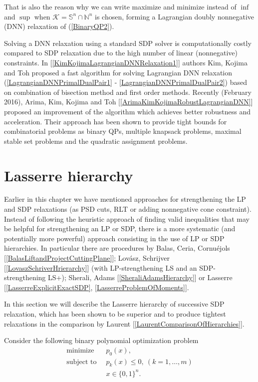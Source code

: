 \documentclass[12pt]{book}
\theoremstyle{definition}
\begin{document}
That is also the reason why we can write maximize and minimize instead of $\inf$ and $\sup$ when 
$\mathcal{K} = \mathbb{S}^n \cap \mathbb{N}^n$ is chosen, forming a Lagrangian doubly nonnegative (DNN) relaxation of (\ref{BinaryQP2}).

Solving a DNN relaxation using a standard SDP solver is computationally costly compared to SDP relaxation due to the high number of linear (nonnegative) constraints. In [\ref{KimKojimaLagrangianDNNRelaxation1}] authors Kim, Kojima and Toh proposed a fast algorithm for solving Lagrangian DNN relaxation (\ref{LagrangianDNNPrimalDualPair1} - \ref{LagrangianDNNPrimalDualPair2}) based on combination of bisection method and first order methods. Recently (February 2016), Arima, Kim, Kojima and Toh [\ref{ArimaKimKojimaRobustLagrangianDNN}] proposed an improvement of the algorithm which achieves better robustness and acceleration. Their approach has been shown to provide tight bounds for combinatorial problems as binary QPs, multiple knapsack problems, maximal stable set problems and the quadratic assignment problems.
 


\section{Lasserre hierarchy}


Earlier in this chapter we have mentioned approaches for strengthening the LP and SDP relaxations (as PSD cuts, RLT or adding nonnegative cone constraint). 
Instead of following the heuristic approach of finding valid inequalities that may be helpful
for strengthening an LP or SDP, there is a more systematic (and potentially more powerful) approach
consisting in the use of LP or SDP hierarchies. In particular there are procedures
by Balas, Ceria, Cornuéjols [\ref{BalasLiftandProjectCuttingPlane}]; Lovász, Schrijver [\ref{LovaszSchriverHrierarchy}] (with LP-strengthening LS
and an SDP-strengthening LS+); Sherali, Adams [\ref{SheraliAdamsHierarchy}] or Lasserre [\ref{LasserreExplicitExactSDP}, \ref{LasserreProblemOfMoments}].  

In this section we will describe the Lasserre hierarchy of successive SDP relaxation, which has been shown to be superior and to produce tightest relaxations in the comparison by Laurent [\ref{LaurentComparisonOfHierarchies}].


Consider the following binary polynomial optimization problem
\begin{equation}
\label{POP1}
\begin{array}{ll}
\mbox{minimize }   & \ p_0(x), 	\\
\mbox{subject to } & \ p_k(x)\leq 0, \ (k=1,\dots ,m) 	\\
		   & \ x\in\{ 0, 1 \}^n.
\end{array}
\end{equation}
\end{document}

